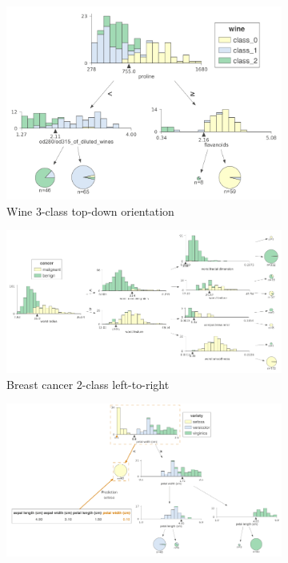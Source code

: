 \begin{figure}[p] 
    \centering
    \begin{subfigure}{0.5\textwidth}
        \includegraphics[width=\linewidth]{images/wine-TD-2.png}
        \caption{Wine 3-class top-down orientation}
        \label{fig:tool_comparison_wine-TD-2}
    \end{subfigure}\hfill
    \begin{subfigure}{0.5\textwidth}
        \includegraphics[width=\linewidth]{images/breast_cancer-LR-3.png}
        \caption{Breast cancer 2-class left-to-right}
        \label{fig:tool_comparison_breast_cancer-LR-3}
    \end{subfigure}
    \vspace{0.5cm} 
    \begin{subfigure}{0.48\textwidth}
        \includegraphics[width=\linewidth]{images/iris-TD-3-X.png}

\end{subfigure}
\end{figure}
